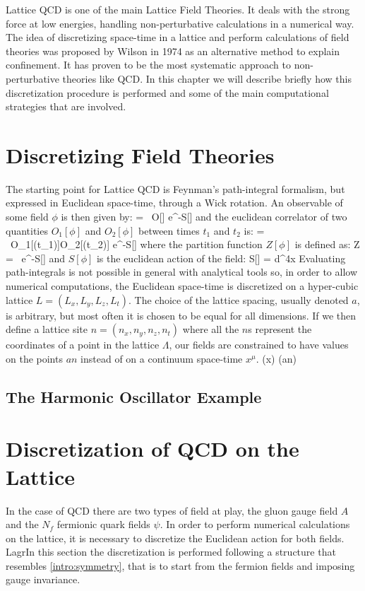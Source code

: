 
Lattice QCD is one of the main Lattice Field Theories. It deals with the strong force at low energies, handling non-perturbative calculations in a numerical way. The idea of discretizing space-time in a lattice and perform calculations of field theories was proposed by Wilson in 1974 \cite{wilson_confinement_1974} as an alternative method to explain confinement. It has proven to be the most systematic approach to non-perturbative theories like QCD. In this chapter we will describe briefly how this discretization procedure is performed and some of the main computational strategies that are involved.

\section{Discretizing Field Theories}

The starting point for Lattice QCD is Feynman's path-integral formalism, but expressed in Euclidean space-time, through a Wick rotation. An observable of some field $\phi$ is then given by:
\beq
	 =  \int \D[\phi] ~O[\phi] e^{-S[\phi]}
\eeq
and the euclidean correlator of two quantities $O_1[\phi]$ and $O_2[\phi]$ between times $t_1$ and $t_2$ is:
\beq
     =  \int \D[\phi] ~O_1[\phi(t_1)]O_2[\phi(t_2)] e^{-S[\phi]}
    \label{lattice:obs_base}
\eeq
where the partition function $Z[\phi]$ is defined as:
\beq
	Z = \int \D[\phi] ~e^{-S[\phi]} 
\eeq
and $S[\phi]$ is the euclidean action of the field:
\beq
S[\phi] = \int d^4x \Lagr [\phi] 
\eeq
Evaluating path-integrals is not possible in general with analytical tools so, in order to allow numerical computations, the Euclidean space-time is discretized on a hyper-cubic lattice $L = (L_x, L_y, L_z, L_t)$. The choice of the lattice spacing, usually denoted $a$, is arbitrary, but most often it is chosen to be equal for all dimensions. If we then define a lattice site $n = (n_x, n_y, n_z, n_t)$ where all the $n$s represent the coordinates of a point in the lattice $\Lambda$, our fields are constrained to have values on the points $an$ instead of on a continuum space-time $x^\mu$.
\beq
    \phi(x)  \phi(an)
\eeq
\subsection{The Harmonic Oscillator Example}

\section{Discretization of QCD on the Lattice}
In the case of QCD there are two types of field at play, the gluon gauge field $A$ and the $N_f$ fermionic quark fields $\psi$. In order to perform numerical calculations on the lattice, it is necessary to discretize the Euclidean action for both fields. \\LagrIn this section the discretization is performed following a structure that resembles \cref{intro:symmetry}, that is to start from the fermion fields and imposing gauge invariance.

